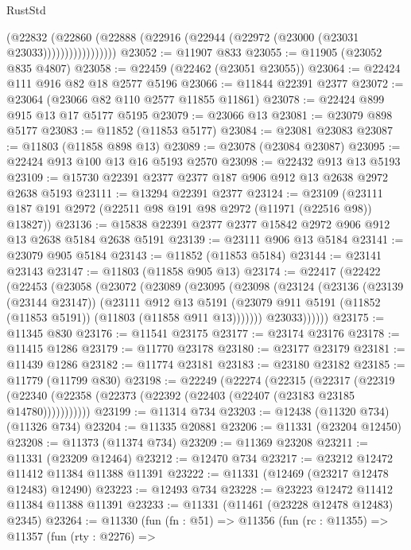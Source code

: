 \begin{lexlean}{RustStd}
\begin{coremodule}
                      (@22832
                        (@22860
                          (@22888 (@22916 (@22944 (@22972 (@23000 (@23031 @23033)))))))))))))))))
@23052 := @11907 @833
@23055 := @11905 (@23052 @835 @4807)
@23058 := @22459 (@22462 (@23051 @23055))
@23064 := @22424 @111 @916 @82 @18 @2577 @5196
@23066 := @11844 @22391 @2377
@23072 := @23064 (@23066 @82 @110 @2577 @11855 @11861)
@23078 := @22424 @899 @915 @13 @17 @5177 @5195
@23079 := @23066 @13
@23081 := @23079 @898 @5177
@23083 := @11852 (@11853 @5177)
@23084 := @23081 @23083
@23087 := @11803 (@11858 @898 @13)
@23089 := @23078 (@23084 @23087)
@23095 := @22424 @913 @100 @13 @16 @5193 @2570
@23098 := @22432 @913 @13 @5193
@23109 := @15730 @22391 @2377 @2377 @187 @906 @912 @13 @2638 @2972 @2638 @5193
@23111 := @13294 @22391 @2377
@23124 := @23109 (@23111 @187 @191 @2972 (@22511 @98 @191 @98 @2972 (@11971 (@22516 @98)) @13827))
@23136 := @15838 @22391 @2377 @2377 @15842 @2972 @906 @912 @13 @2638 @5184 @2638 @5191
@23139 := @23111 @906 @13 @5184
@23141 := @23079 @905 @5184
@23143 := @11852 (@11853 @5184)
@23144 := @23141 @23143
@23147 := @11803 (@11858 @905 @13)
@23174 := @22417
    (@22422
      (@22453
        (@23058
          (@23072
            (@23089
              (@23095
                (@23098
                  (@23124
                    (@23136
                      (@23139 (@23144 @23147))
                      (@23111
                        @912
                        @13
                        @5191
                        (@23079 @911 @5191 (@11852 (@11853 @5191)) (@11803 (@11858 @911 @13)))))))
                @23033))))))
@23175 := @11345 @830
@23176 := @11541 @23175
@23177 := @23174 @23176
@23178 := @11415 @1286
@23179 := @11770 @23178
@23180 := @23177 @23179
@23181 := @11439 @1286
@23182 := @11774 @23181
@23183 := @23180 @23182
@23185 := @11779 (@11799 @830)
@23198 := @22249
    (@22274
      (@22315
        (@22317
          (@22319 (@22340 (@22358 (@22373 (@22392 (@22403 (@22407 (@23183 @23185 @14780)))))))))))
@23199 := @11314 @734
@23203 := @12438 (@11320 @734) (@11326 @734)
@23204 := @11335 @20881
@23206 := @11331 (@23204 @12450)
@23208 := @11373 (@11374 @734)
@23209 := @11369 @23208
@23211 := @11331 (@23209 @12464)
@23212 := @12470 @734
@23217 := @23212 @12472 @11412 @11384 @11388 @11391
@23222 := @11331 (@12469 (@23217 @12478 @12483) @12490)
@23223 := @12493 @734
@23228 := @23223 @12472 @11412 @11384 @11388 @11391
@23233 := @11331 (@11461 (@23228 @12478 @12483) @2345)
@23264 := @11330
    (fun (fn : @51) =>
    @11356
      (fun (rc : @11355) =>
      @11357
        (fun (rty : @2276) =>

\end{coremodule}
\end{lexlean}
